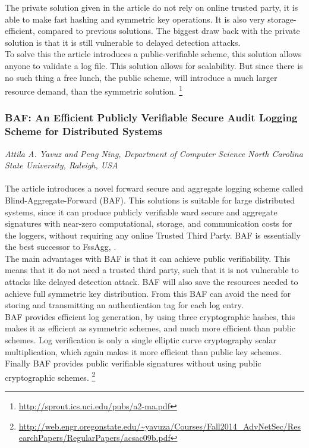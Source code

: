 The private solution given in the article do not rely on online trusted party, it is able to make fast hashing and symmetric key operations. It is also very storage-efficient, compared to previous solutions. The biggest draw back with the private solution is that it is still vulnerable to delayed detection attacks.\\
To solve this the article introduces a public-verifiable scheme, this solution allows anyone to validate a log file. This solution allows for scalability. But since there is no such thing a free lunch, the public scheme, will introduce a much larger resource demand, than the symmetric solution.  
\footnote{\url{http://sprout.ics.uci.edu/pubs/a2-ma.pdf}}


\subsubsection{BAF: An Efficient Publicly Verifiable Secure Audit Logging Scheme for Distributed Systems}
\footnotesize\textit{Attila A. Yavuz and Peng Ning, Department of Computer Science North Carolina State University, Raleigh, USA}\\\\
\normalsize
The article introduces a novel forward secure and aggregate logging scheme called Blind-Aggregate-Forward (BAF). This solutions is suitable for large distributed systems, since it can produce publicly verifiable ward secure and aggregate signatures with near-zero computational, storage, and communication costs for the loggers, without requiring any online Trusted Third Party.  BAF is essentially the best successor to FssAgg, . \\
The main advantages with BAF is that it can achieve public verifiability. This means that it do not need a trusted third party, such that it is not vulnerable to attacks like delayed detection attack. BAF will also save the resources needed to achieve full symmetric key distribution. From this BAF can avoid the need for storing and transmitting an authentication tag for each log entry.  \\
BAF provides efficient log generation, by using three cryptographic hashes, this makes it as efficient as symmetric schemes, and much more efficient than public schemes. Log verification is only a single elliptic curve cryptography scalar multiplication, which again makes it more efficient than public key schemes. Finally BAF provides public verifiable signatures without using public cryptographic schemes. \footnote{\raggedright \url{http://web.engr.oregonstate.edu/~yavuza/Courses/Fall2014_AdvNetSec/ResearchPapers/RegularPapers/acsac09b.pdf}}

